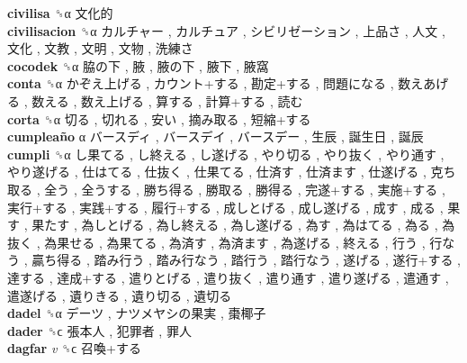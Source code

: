 \textbf{civilisa} ␝α   文化的   \\
\textbf{civilisacion} ␝α   カルチャー ,  カルチュア ,  シビリゼーション ,  上品さ ,  人文 ,  文化 ,  文教 ,  文明 ,  文物 ,  洗練さ   \\
\textbf{cocodek} ␝α   脇の下 ,  腋 ,  腋の下 ,  腋下 ,  腋窩   \\
\textbf{conta} ␝α   かぞえ上げる ,  カウント+する ,  勘定+する ,  問題になる ,  数えあげる ,  数える ,  数え上げる ,  算する ,  計算+する ,  読む   \\
\textbf{corta} ␝α   切る ,  切れる ,  安い ,  摘み取る ,  短縮+する   \\
\textbf{cumpleaño} α   バースディ ,  バースデイ ,  バースデー ,  生辰 ,  誕生日 ,  誕辰   \\
\textbf{cumpli} ␝α   し果てる ,  し終える ,  し遂げる ,  やり切る ,  やり抜く ,  やり通す ,  やり遂げる ,  仕はてる ,  仕抜く ,  仕果てる ,  仕済す ,  仕済ます ,  仕遂げる ,  克ち取る ,  全う ,  全うする ,  勝ち得る ,  勝取る ,  勝得る ,  完遂+する ,  実施+する ,  実行+する ,  実践+する ,  履行+する ,  成しとげる ,  成し遂げる ,  成す ,  成る ,  果す ,  果たす ,  為しとげる ,  為し終える ,  為し遂げる ,  為す ,  為はてる ,  為る ,  為抜く ,  為果せる ,  為果てる ,  為済す ,  為済ます ,  為遂げる ,  終える ,  行う ,  行なう ,  贏ち得る ,  踏み行う ,  踏み行なう ,  踏行う ,  踏行なう ,  遂げる ,  遂行+する ,  達する ,  達成+する ,  遣りとげる ,  遣り抜く ,  遣り通す ,  遣り遂げる ,  遣通す ,  遣遂げる ,  遺りきる ,  遺り切る ,  遺切る   \\
\textbf{dadel} ␝α   デーツ ,  ナツメヤシの果実 ,  棗椰子   \\
\textbf{dader} ␝ϲ   張本人 ,  犯罪者 ,  罪人   \\
\textbf{dagfar} \emph{v}  ␝ϲ   召喚+する   \\
